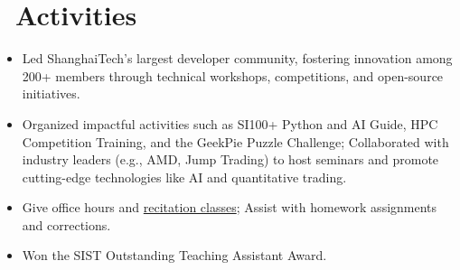 \documentclass{resume}
\begin{document}



\section{\faInfo\ Activities}


\begin{itemize}
  \item Led ShanghaiTech’s largest developer community, fostering innovation among 200+ members through technical workshops, competitions, and open-source initiatives.
  \item Organized impactful activities such as SI100+ Python and AI Guide, HPC Competition Training, and the GeekPie Puzzle Challenge; Collaborated with industry leaders (e.g., AMD, Jump Trading) to host seminars and promote cutting-edge technologies like AI and quantitative trading.
\end{itemize}
\vspace{-0.5em}


\begin{itemize}
  \item Give office hours and \href{https://github.com/GKxxQAQ/CS100-recitations-spring2023}{recitation classes}; Assist with homework assignments and corrections.
  \item Won the SIST Outstanding Teaching Assistant Award.
\end{itemize}
\vspace{-0.5em}
\end{document}
